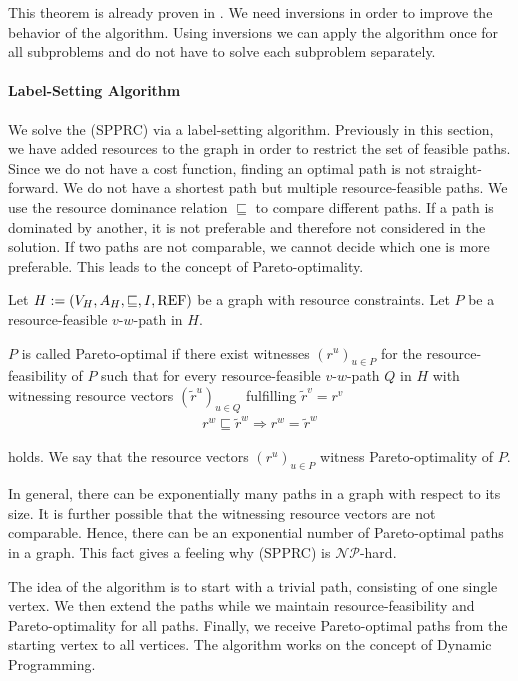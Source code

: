 This theorem is already proven in \cite[p.~83]{Kaiser}. We need inversions in order to improve the behavior of the algorithm. Using inversions we can apply the algorithm once for all subproblems and do not have to solve each subproblem separately.

\paragraph{Label-Setting Algorithm} \parfill

We solve the (SPPRC) via a label-setting algorithm. Previously in this section, we have added resources to the graph in order to restrict the set of feasible paths. Since we do not have a cost function, finding an optimal path is not straight-forward. We do not have a shortest path but multiple resource-feasible paths. We use the resource dominance relation $\sqsubseteq$ to compare different paths. If a path is dominated by another, it is not preferable and therefore not considered in the solution. If two paths are not comparable, we cannot decide which one is more preferable. This leads to the concept of Pareto-optimality.

\begin{definition}

Let ${H:=\left(V_H,A_H,\sqsubseteq,I,\operatorname{REF}\right)}$ be a graph with resource constraints. Let $P$ be a resource-feasible $v$-$w$-path in $H$.

$P$ is called Pareto-optimal if there exist witnesses $\left(r^u\right)_{u\in P}$ for the resource-feasibility of $P$ such that for every resource-feasible $v$-$w$-path $Q$ in $H$ with witnessing resource vectors $\left(\tilde{r}^u\right)_{u\in Q}$ fulfilling ${\tilde{r}^v = r^v}$
\begin{align*}
	r^w\sqsubseteq \tilde{r}^w \Rightarrow r^w = \tilde{r}^w
\end{align*}

holds. We say that the resource vectors $\left(r^u\right)_{u\in P}$ witness Pareto-optimality of $P$.

\end{definition}

In general, there can be exponentially many paths in a graph with respect to its size. It is further possible that the witnessing resource vectors are not comparable. Hence, there can be an exponential number of Pareto-optimal paths in a graph. This fact gives a feeling why (SPPRC) is $\mathcal{NP}$-hard.

The idea of the algorithm is to start with a trivial path, consisting of one single vertex. We then extend the paths while we maintain resource-feasibility and Pareto-optimality for all paths. Finally, we receive Pareto-optimal paths from the starting vertex to all vertices. The algorithm works on the concept of Dynamic Programming.

